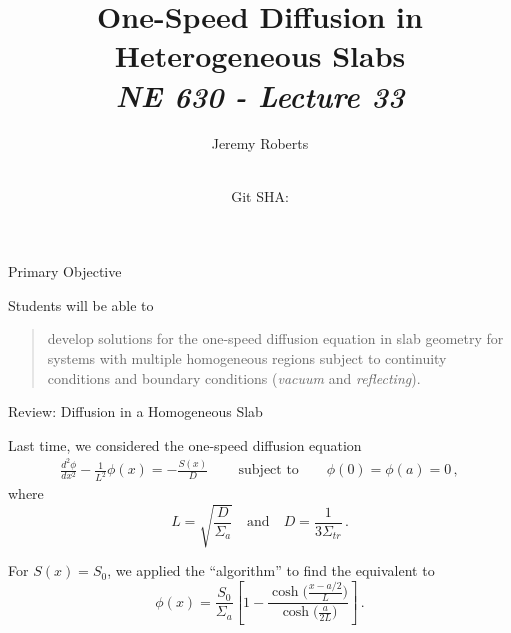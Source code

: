 \documentclass[aspectratio=1610]{beamer}
\title{One-Speed Diffusion in \\ Heterogeneous Slabs \\
       {\small\it NE 630 - Lecture 33}}
\date{ \\ {\footnotesize Git SHA: }}
\author{Jeremy Roberts}
\newcommand{\flux}{\phi}
\newcommand{\SigA}{\Sigma_a}
\newcommand{\Ldiff}{L}
\begin{document}
\begin{frame}
\titlepage
\end{frame}
 
 
\begin{frame}{Primary Objective}

Students will be able to 

\vfill

\begin{quote}
\textcolor{wcprimary}{develop solutions for the one-speed diffusion equation in 
slab geometry for systems with multiple homogeneous regions subject to continuity conditions and boundary conditions (\emph{vacuum} and \emph{reflecting}).
}
\end{quote}

 

\end{frame}

\begin{frame}[fragile]{Review: Diffusion in a Homogeneous Slab}

Last time, we considered the one-speed diffusion equation
\begin{align*}
   \frac{d^2 \phi}{d x^2}
  - \frac{1}{L^2}\flux(x) 
  = -\frac{S(x)}{D} \, \qquad \text{subject to} \qquad \phi(0) = \phi(a) = 0 \, ,
\end{align*}
where 
\begin{equation*}
 L = \sqrt{\frac{D}{\Sigma_a}} \quad \text{and} \quad D = \frac{1}{3\Sigma_{tr}} \, . 
\end{equation*}

For $S(x) = S_0$, we applied the ``algorithm''  to find the equivalent to
\begin{equation*}
 \flux(x)=\frac{S_0}{\SigA}\left[1-\frac{\cosh\!\big(\tfrac{x-a/2}{\Ldiff}\big)}{\cosh\!\big(\tfrac{a}{2\Ldiff}\big)}\right] \, .
 \label{eq:ex1sol}
\end{equation*}

\end{frame}
\end{document}
